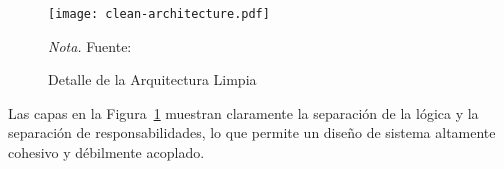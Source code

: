 \begin{figure}
    \centering
	\caption{Detalle de la Arquitectura Limpia} \label{fig:cleanCodeBlog}
	\texttt{[image: clean-architecture.pdf]}

    \vspace{0.5em}
    \begin{minipage}{\textwidth}
        \small\textit{Nota.} Fuente: \textcite{CleanCodeBlog}
    \end{minipage}
\end{figure}

Las capas en la Figura~\ref{fig:cleanCodeBlog} muestran claramente la separación de la lógica y la separación de responsabilidades, lo que permite un diseño de sistema altamente cohesivo y débilmente acoplado.


